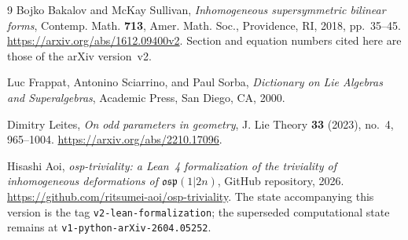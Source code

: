 \documentclass[11pt]{article}
\numberwithin{equation}{section}
\theoremstyle{remark}
\begin{document}
\begin{thebibliography}{9}
Bojko Bakalov and McKay Sullivan,
\emph{Inhomogeneous supersymmetric bilinear forms},
Contemp. Math. \textbf{713}, Amer. Math. Soc., Providence, RI, 2018, pp.~35--45.
\url{https://arxiv.org/abs/1612.09400v2}.
Section and equation numbers cited here are those of the arXiv version~v2.

Luc Frappat, Antonino Sciarrino, and Paul Sorba,
\emph{Dictionary on Lie Algebras and Superalgebras},
Academic Press, San Diego, CA, 2000.

Dimitry Leites,
\emph{On odd parameters in geometry},
J. Lie Theory \textbf{33} (2023), no.~4, 965--1004.
\url{https://arxiv.org/abs/2210.17096}.

Hisashi Aoi,
\emph{osp-triviality: a Lean~4 formalization of the triviality of
inhomogeneous deformations of $\mathfrak{osp}(1|2n)$},
GitHub repository, 2026.
\url{https://github.com/ritsumei-aoi/osp-triviality}.
The state accompanying this version is the tag \texttt{v2-lean-formalization};
the superseded computational state remains at \texttt{v1-python-arXiv-2604.05252}.

\end{thebibliography}
\end{document}
